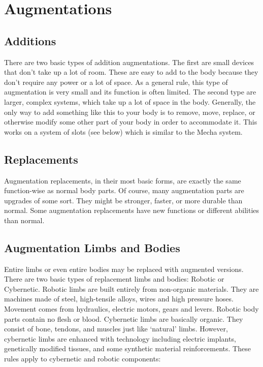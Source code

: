 \documentclass[twoside]{book}
\begin{document}
    

\chapter{Augmentations}
    
    

\section{Additions}
     There are two basic types of addition augmentations.
             The first are small devices that don't take up a lot
             of room. These are easy to add to the body because they
             don't require any power or a lot of space. As a
             general rule, this type of augmentation is very small and
             its function is often limited.  The second type are larger, complex systems, which
             take up a lot of space in the body. Generally, the only way
             to add something like this to your body is to remove, move,
             replace, or otherwise modify some other part of your body in
             order to accommodate it. This works on a system of slots
             (see below) which is similar to the Mecha system. 
    

\section{Replacements}
     Augmentation replacements, in their most basic forms,
             are exactly the same function-wise as normal body parts. Of
             course, many augmentation parts are upgrades of some sort.
             They might be stronger, faster, or more durable than normal.
             Some augmentation replacements have new functions or
             different abilities than normal. 
    

\section{Augmentation Limbs and Bodies}
     Entire limbs or even entire bodies may be replaced
             with augmented versions. There are two basic types of
             replacement limbs and bodies: Robotic or Cybernetic.  Robotic limbs are built entirely from non-organic
             materials. They are machines made of steel, high-tensile
             alloys, wires and high pressure hoses. Movement comes from
             hydraulics, electric motors, gears and levers. Robotic body
             parts contain no flesh or blood.  Cybernetic limbs are basically organic. They consist
             of bone, tendons, and muscles just like
             `natural' limbs. However, cybernetic limbs are
             enhanced with technology including electric implants,
             genetically modified tissues, and some synthetic material
             reinforcements.  These rules apply to cybernetic and robotic
             components: 
    
\end{document}
